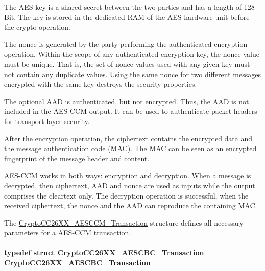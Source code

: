 The A\+E\+S key is a shared secret between the two parties and has a length of 128 Bit. The key is stored in the dedicated R\+A\+M of the A\+E\+S hardware unit before the crypto operation.

The nonce is generated by the party performing the authenticated encryption operation. Within the scope of any authenticated encryption key, the nonce value must be unique. That is, the set of nonce values used with any given key must not contain any duplicate values. Using the same nonce for two different messages encrypted with the same key destroys the security properties.

The optional A\+A\+D is authenticated, but not encrypted. Thus, the A\+A\+D is not included in the A\+E\+S-\/\+C\+C\+M output. It can be used to authenticate packet headers for transport layer security.

After the encryption operation, the ciphertext contains the encrypted data and the message authentication code (M\+A\+C). The M\+A\+C can be seen as an encrypted fingerprint of the message header and content.

A\+E\+S-\/\+C\+C\+M works in both ways\+: encryption and decryption. When a message is decrypted, then ciphertext, A\+A\+D and nonce are used as inputs while the output comprises the cleartext only. The decryption operation is successful, when the received ciphertext, the nonce and the A\+A\+D can reproduce the containing M\+A\+C.

The \hyperlink{struct_crypto_c_c26_x_x___a_e_s_c_c_m___transaction}{Crypto\+C\+C26\+X\+X\+\_\+\+A\+E\+S\+C\+C\+M\+\_\+\+Transaction} structure defines all necessary parameters for a A\+E\+S-\/\+C\+C\+M transaction. 
\paragraph[{Crypto\+C\+C26\+X\+X\+\_\+\+A\+E\+S\+C\+B\+C\+\_\+\+Transaction}]{\setlength{\rightskip}{0pt plus 5cm}typedef struct {\bf Crypto\+C\+C26\+X\+X\+\_\+\+A\+E\+S\+C\+B\+C\+\_\+\+Transaction}  {\bf Crypto\+C\+C26\+X\+X\+\_\+\+A\+E\+S\+C\+B\+C\+\_\+\+Transaction}}\label{_crypto_c_c26_x_x_8h_ac88ef72b5742d84ef0d51ee6b0fd2fc7}


